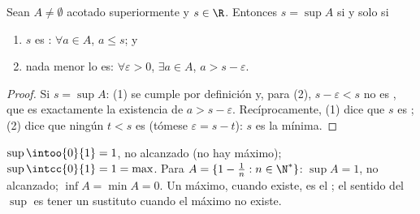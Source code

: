 \begin{proposition}\label{prop:b1:reals:epsilon}
Sean $A \neq \emptyset$ acotado superiormente y $s \in \R$. Entonces
$s = \sup A$ si y solo si
\begin{enumerate}
  \item $s$ es : $\forall a \in A$, $a \leq s$; y
  \item nada menor lo es: $\forall \varepsilon > 0$, $\exists a \in
        A$, $a > s - \varepsilon$.
\end{enumerate}
\end{proposition}

\begin{proof}
Si $s = \sup A$: (1) se cumple por definición y, para (2),
$s - \varepsilon < s$ no es , que es exactamente la
existencia de $a > s - \varepsilon$. Recíprocamente, (1) dice que $s$
es ; (2) dice que ningún $t < s$ es 
(tómese $\varepsilon = s - t$): $s$ es la mínima.
\end{proof}

\begin{example}\label{ex:b1:reals:supexamples}
$\sup \intoo{0}{1} = 1$, no alcanzado (no hay máximo);
$\sup \intcc{0}{1} = 1 = \max$. Para $A = \{1 - \frac 1n : n \in
\N^*\}$: $\sup A = 1$, no alcanzado; $\inf A = \min A = 0$. Un máximo,
cuando existe, es el ; el sentido del $\sup$ es tener un
sustituto cuando el máximo no existe.
\end{example}

